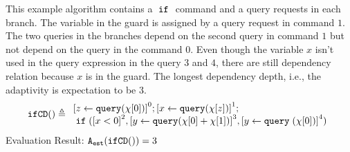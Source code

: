             \begin{example}
   \label{ex:ifCD}
   This example algorithm contains a $\;\mathtt{if}\;$ command and a query requests
   in each branch.
   The variable in the guard is assigned by a query request in command $1$.
   The two queries in the branches depend on the second query in command $1$
   but not depend on the query in the command $0$.
   Even though the variable $x$ isn't used in the query expression in the query $3$ and $4$,
   there are still dependency relation because $x$ is in the guard.
%
The longest dependency depth, i.e., the adaptivity is expectation to be $3$.
   \[
   \kw{ifCD()} \triangleq 
   \begin{array}{l}
\clabel{ \assign{z}{\query(\chi[0])}}^{0} ;
\clabel{\assign{x}{\query(\chi[z])} }^{1} ; \\
\eif(\clabel{x < 0}^{2}, 
\clabel{\assign{y}{\query(\chi[0] + \chi[1])}}^{3}, 
\clabel{\assign{y}\query{(\chi[0])}}^{4})
   \end{array}
   \]
   Evaluation Result: $ {\mathtt{A_{est}}}( \mathtt{ifCD()}) = 3$
   \end{example}
    
